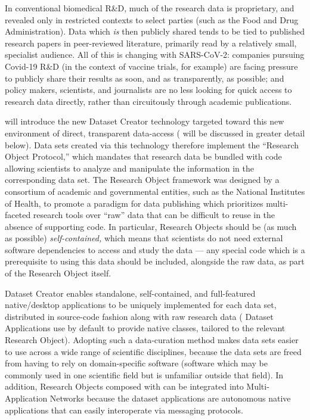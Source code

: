 \documentclass[11pt,letterpaper]{article}
\newcommand{\textds}[1]{{\fontfamily{lmdh}\selectfont{%
\raisebox{-1pt}{#1}}}}
\newcommand{\dsC}{{\textds{ds}{\fontfamily{qhv}\selectfont \raisebox{-1pt}
{\color{red!15!black}{C}}}}}
\newcommand{\ATextCClr}[1]{\textcolor{atcColor}{\textbf{#1}}}
\newcommand{\lCRtwo}{{\resizebox{!}{8pt}{\ATextCClr{CR2}}}}
\newcommand{\GUI}{\resizebox{!}{7pt}{\AcronymText{GUI}}}
\newcommand{\textscc}[1]{{\color{orr!35!black}{{%
						\fontfamily{Cabin-TLF}\fontseries{b}\selectfont{\textsc{\scriptsize{#1}}}}}}}
\newcommand{\AcronymText}[1]{{\textscc{#1}}}
\newcommand{\Qt}{\resizebox{!}{7pt}{\AcronymText{Qt}}}
\newcommand{\p}[1]{

\vspace{1em}#1}
\newcommand{\q}[1]{{\fontfamily{qcr}\selectfont ``}#1{\fontfamily{qcr}\selectfont ''}}
\newcommand{\textds}[1]{{\fontfamily{lmdh}\selectfont{%
\raisebox{-1pt}{#1}}}}
\newcommand{\dsC}{{\textds{ds}{\fontfamily{qhv}\selectfont \raisebox{-1pt}{C}}}}
\begin{document}
{\p{In conventional biomedical R\&D, much of the research 
data is proprietary, and revealed only in restricted 
contexts to select parties (such as the Food and Drug 
Administration).  Data which \textit{is} then publicly shared 
tends to be tied to published research papers 
in peer-reviewed literature, primarily read 
by a relatively small, specialist audience.  All of this is 
changing with SARS-CoV-2: companies pursuing 
Covid-19 R\&D (in the context of vaccine trials, for example) 
are facing pressure to publicly share their results 
as soon, and as transparently, as possible; and 
policy makers, scientists, and journalists are no 
less looking for quick access to research data directly, 
rather than circuitously through academic publications.}

\p{\lCRtwo{} will introduce the new Dataset Creator technology 
targeted toward this new environment of direct, transparent 
data-access (\dsC{} will be discussed in greater detail below).  
Data sets created 
via this technology therefore implement the \q{Research Object Protocol,} 
which mandates that research data be bundled with code allowing 
scientists to analyze and manipulate the information in the 
corresponding data set.  The Research Object framework was 
designed by a consortium of academic and governmental 
entities, such as the National Institutes of Health, to 
promote a paradigm for data publishing which prioritizes 
multi-faceted research tools over \q{raw} data that 
can be difficult to reuse in the absence of supporting code.  
In particular, Research Objects 
should be (as much as possible) \textit{self-contained,} 
which means that scientists do not need external 
software dependencies to access and study the data --- any special 
code which is a prerequisite to using this data should 
be included, alongside the raw data, as part of the 
Research Object itself.}

\p{Dataset Creator enables 
standalone, self-contained, and full-featured 
native/desktop applications to be uniquely implemented 
for each data set, distributed in source-code fashion 
along with raw research data (\dsC{} Dataset Applications 
use \Qt{} by default to provide native \GUI{} classes, 
tailored to the relevant Research Object).  Adopting such a 
data-curation method makes data sets easier to 
use across a wide range of scientific disciplines, 
because the data sets are freed from having to rely on domain-specific 
software (software which may be commonly used in one scientific 
field but is unfamiliar outside that field).  
In addition, Research Objects composed with \dsC{} can 
be integrated into Multi-Application Networks  
because 
the dataset applications are autonomous native \GUI{} applications that 
can easily interoperate via \Qt{} messaging protocols.}

}
\end{document}
